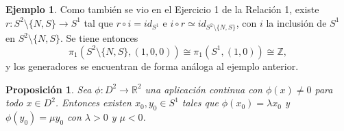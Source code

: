 \documentclass[11pt]{report}
\newtheorem{proposition}{Proposición}[chapter]
\theoremstyle{definition}
\theoremstyle{definition}
\newtheorem{example}{Ejemplo}[chapter]
\theoremstyle{remark}
\newcommand{\R}{\mathbb R}
\newcommand{\Z}{\mathbb Z}
\begin{document}
\begin{example}
Como también se vio en el Ejercicio 1 de la Relación 1, existe $r \colon S^2 \setminus \{N,S\} \to S^1$ tal que $r \circ i = id_{S^1}$ e $i \circ r \simeq id_{S^2 \setminus \{N,S\}}$, con $i$ la inclusión de $S^1$ en $S^2\setminus \{N,S\}$. Se tiene entonces
\[\pi_1 (S^2 \setminus \{N,S\}, (1,0,0)) \cong \pi_1(S^1,(1,0)) \cong \Z,\]
y los generadores se encuentran de forma análoga al ejemplo anterior.
\end{example}

\begin{proposition}
Sea $\phi \colon D^2 \to \R^2$ una aplicación continua con $\phi(x) \neq 0$ para todo $x \in D^2$. Entonces existen $x_0, y_0 \in S^1$ tales que $\phi(x_0) = \lambda x_0$ y $\phi(y_0) = \mu y_0$ con $\lambda >0$ y $\mu < 0$.
\end{proposition}
\end{document}
